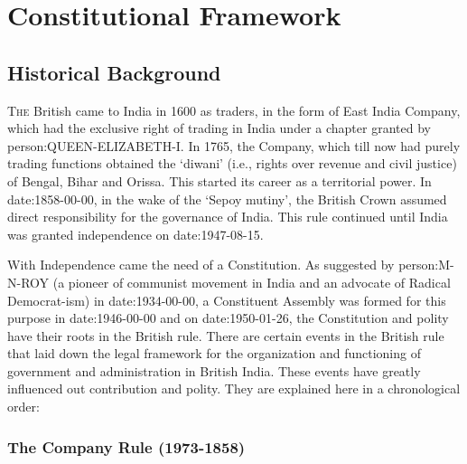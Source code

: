 %

\thispagestyle{empty}
\part{Constitutional Framework}
\restoregeometry
\cleardoublepage

%

\chapter{Historical Background}

\begin{multicol}{2}

\lettrine[lines=3,nindent=0pt]{T}{he} British came to India in 1600 as traders, in the form of East India Company, which had the exclusive right of trading in India under a chapter granted by \gls{person:QUEEN-ELIZABETH-I}. In 1765, the Company, which till now had purely trading functions obtained the `diwani' (i.e., rights over revenue and civil justice) of Bengal, Bihar and Orissa. This started its career as a territorial power. In \gls{date:1858-00-00}, in the wake of the `Sepoy mutiny', the British Crown assumed direct responsibility for the governance of India. This rule continued until India was granted independence on \gls{date:1947-08-15}.

With Independence came the need of a Constitution. As suggested by \gls{person:M-N-ROY} (a pioneer of communist movement in India and an advocate of Radical Democrat-ism) in \gls{date:1934-00-00}, a Constituent Assembly was formed for this purpose in \gls{date:1946-00-00} and on \gls{date:1950-01-26}, the Constitution and polity have their roots in the British rule. There are certain events in the British rule that laid down the legal framework for the organization and functioning of government and administration in British India. These events have greatly influenced out contribution and polity. They are explained here in a chronological order:

\section{The Company Rule (1973-1858)}


\end{multicol}
